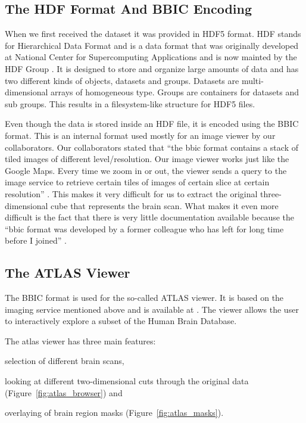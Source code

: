 \subsection{The HDF Format And BBIC Encoding}

When we first received the dataset it was provided in HDF5 format. HDF stands for Hierarchical Data Format and is a data format that was originally developed at National Center for Supercomputing Applications  and is now mainted by the HDF Group \cite{HDF5:website}. It is designed to store and organize large amounts of data and has two different kinds of objects, datasets and groups. Datasets are multi-dimensional arrays of homogeneous type. Groups are containers for datasets and sub groups. This results in a filesystem-like structure for HDF5 files.

Even though the data is stored inside an HDF file, it is encoded using the BBIC format. This is an internal format used mostly for an image viewer by our collaborators. Our collaborators stated that ``the bbic format contains a stack of tiled images of different level/resolution. Our image viewer works just like the Google Maps. Every time we zoom in or out, the viewer sends a query to the image service to retrieve certain tiles of images of certain slice at certain resolution'' \cite{BBIC:about}. This makes it very difficult for us to extract the original three-dimensional cube that represents the brain scan. What makes it even more difficult is the fact that there is very little documentation available because the  ``bbic format was developed by a former colleague who has left for long time before I joined'' \cite{BBIC:dev}.

\subsection{The ATLAS Viewer}

The BBIC format is used for the so-called ATLAS viewer. It is based on the imaging service mentioned above and is available at \cite{hbp:atlasviewer}. The viewer allows the user to interactively explore a subset of the Human Brain Database.

The atlas viewer has three main features:
\begin{inparaenum}[(1)]
\item selection of different brain scans,
\item looking at different two-dimensional cuts through the original data (Figure~\ref{fig:atlas_browser}) and
\item overlaying of brain region masks (Figure~\ref{fig:atlas_masks}).
\end{inparaenum}

